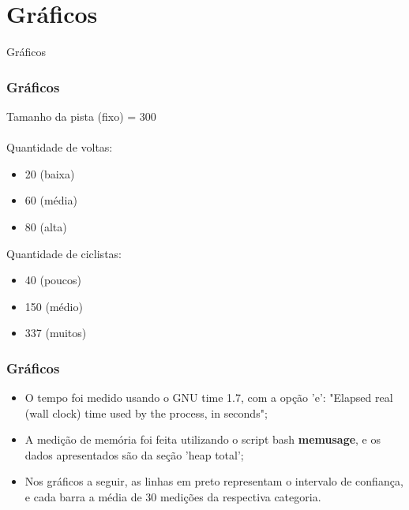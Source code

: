 \documentclass{beamer}
\begin{document}
\section{Gráficos}

\begin{frame}
\begin{center}
\huge Gráficos
\end{center}
\end{frame}

\begin{frame}
\frametitle{Gráficos}
Tamanho da pista (fixo) = 300
\\~\\
Quantidade de voltas:
\begin{itemize}
\item 20 (baixa)
\item 60 (média)
\item 80 (alta)
\end{itemize}
Quantidade de ciclistas:
\begin{itemize}
\item 40 (poucos)
\item 150 (médio)
\item 337 (muitos)
\end{itemize}
\end{frame}

\begin{frame}
\frametitle{Gráficos}
\begin{itemize}
\item O tempo foi medido usando o GNU time 1.7, com a opção 'e':
"Elapsed real (wall clock) time used by the process, in seconds"; 
\item A medição de memória foi feita utilizando o script bash \textbf{memusage}, e os dados apresentados são da seção 'heap total';
\item Nos gráficos a seguir, as linhas em preto representam o intervalo de confiança, e cada barra a média de 30 medições da respectiva categoria.
\end{itemize}
\end{frame}
\end{document}

